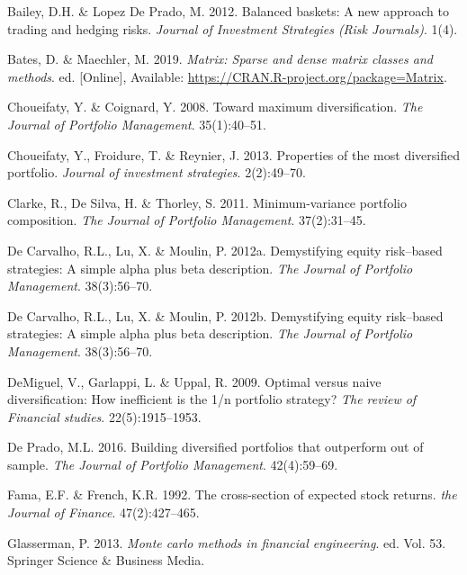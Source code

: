 \documentclass[11pt,preprint, authoryear]{elsarticle}
\numberwithin{equation}{section}
\numberwithin{figure}{section}
\numberwithin{table}{section}
\begin{document}
\leavevmode\hypertarget{ref-lopez2012}{}%
Bailey, D.H. \& Lopez De Prado, M. 2012. Balanced baskets: A new
approach to trading and hedging risks. \emph{Journal of Investment
Strategies (Risk Journals)}. 1(4).

\leavevmode\hypertarget{ref-Matrix}{}%
Bates, D. \& Maechler, M. 2019. \emph{Matrix: Sparse and dense matrix
classes and methods}. ed. {[}Online{]}, Available:
\url{https://CRAN.R-project.org/package=Matrix}.

\leavevmode\hypertarget{ref-choueifaty2008}{}%
Choueifaty, Y. \& Coignard, Y. 2008. Toward maximum diversification.
\emph{The Journal of Portfolio Management}. 35(1):40--51.

\leavevmode\hypertarget{ref-choueifaty2013}{}%
Choueifaty, Y., Froidure, T. \& Reynier, J. 2013. Properties of the most
diversified portfolio. \emph{Journal of investment strategies}.
2(2):49--70.

\leavevmode\hypertarget{ref-clarke2011}{}%
Clarke, R., De Silva, H. \& Thorley, S. 2011. Minimum-variance portfolio
composition. \emph{The Journal of Portfolio Management}. 37(2):31--45.

\leavevmode\hypertarget{ref-leote}{}%
De Carvalho, R.L., Lu, X. \& Moulin, P. 2012a. Demystifying equity
risk--based strategies: A simple alpha plus beta description. \emph{The
Journal of Portfolio Management}. 38(3):56--70.

\leavevmode\hypertarget{ref-rawl2012}{}%
De Carvalho, R.L., Lu, X. \& Moulin, P. 2012b. Demystifying equity
risk--based strategies: A simple alpha plus beta description. \emph{The
Journal of Portfolio Management}. 38(3):56--70.

\leavevmode\hypertarget{ref-demiguel2009}{}%
DeMiguel, V., Garlappi, L. \& Uppal, R. 2009. Optimal versus naive
diversification: How inefficient is the 1/n portfolio strategy?
\emph{The review of Financial studies}. 22(5):1915--1953.

\leavevmode\hypertarget{ref-lopez}{}%
De Prado, M.L. 2016. Building diversified portfolios that outperform out
of sample. \emph{The Journal of Portfolio Management}. 42(4):59--69.

\leavevmode\hypertarget{ref-fama1992}{}%
Fama, E.F. \& French, K.R. 1992. The cross-section of expected stock
returns. \emph{the Journal of Finance}. 47(2):427--465.

\leavevmode\hypertarget{ref-glasserman2013}{}%
Glasserman, P. 2013. \emph{Monte carlo methods in financial
engineering}. ed. Vol. 53. Springer Science \& Business Media.
\end{document}
